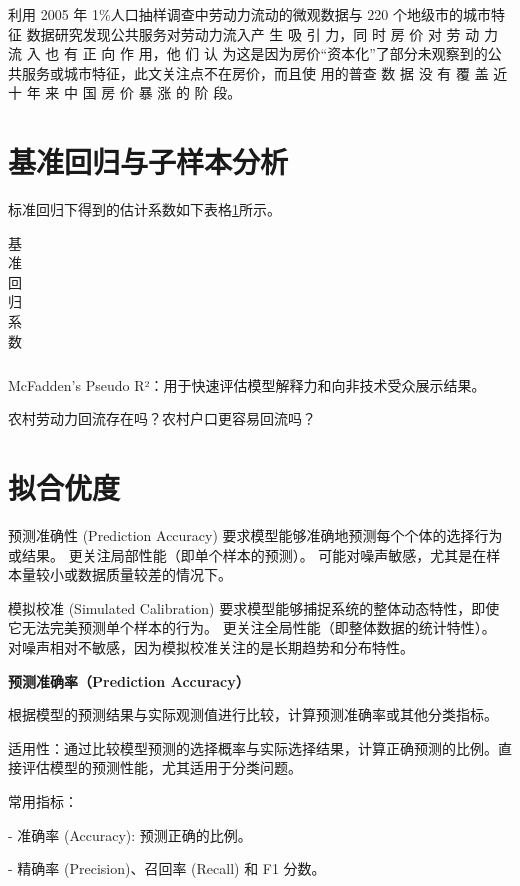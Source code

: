 \documentclass[a4paper, zihao=-4, fontset = mac, oneside]{ctexbook} %
\begin{document}
\textcite{XiaYiRanChengShiJianDeMengMuSanQianGongGongFuWuYingXiangLaoDongLiLiuXiangDeJingYanYanJiu2015} 利用 2005 年 1\%人口抽样调查中劳动力流动的微观数据与 220 个地级市的城市特征 数据研究发现公共服务对劳动力流入产 生 吸 引 力，同 时 房 价 对 劳 动 力 流 入 也 有 正 向 作 用，他 们 认 为这是因为房价“资本化”了部分未观察到的公共服务或城市特征，此文关注点不在房价，而且使 用的普查 数 据 没 有 覆 盖 近 十 年 来 中 国 房 价 暴 涨 的 阶 段。

\section{基准回归与子样本分析} %


标准回归下得到的估计系数如下表格\ref{tab:基准回归系数}所示。
\begin{table}[!ht]
\centering
\caption{基准回归系数}
\begin{tabularx}{\textwidth}{@{}cXXX@{}}
\toprule
\midrule
\bottomrule
\end{tabularx}
\label{tab:基准回归系数}
\end{table}



McFadden’s Pseudo R²：用于快速评估模型解释力和向非技术受众展示结果。


农村劳动力回流存在吗？农村户口更容易回流吗？


\section{拟合优度} 

预测准确性 (Prediction Accuracy) 
要求模型能够准确地预测每个个体的选择行为或结果。
更关注局部性能（即单个样本的预测）。
可能对噪声敏感，尤其是在样本量较小或数据质量较差的情况下。

模拟校准 (Simulated Calibration) 
要求模型能够捕捉系统的整体动态特性，即使它无法完美预测单个样本的行为。
更关注全局性能（即整体数据的统计特性）。
对噪声相对不敏感，因为模拟校准关注的是长期趋势和分布特性。

\textbf{预测准确率（Prediction Accuracy）}

根据模型的预测结果与实际观测值进行比较，计算预测准确率或其他分类指标。

适用性：通过比较模型预测的选择概率与实际选择结果，计算正确预测的比例。直接评估模型的预测性能，尤其适用于分类问题。

常用指标：

- 准确率 (Accuracy): 预测正确的比例。

- 精确率 (Precision)、召回率 (Recall) 和 F1 分数。
\end{document}
